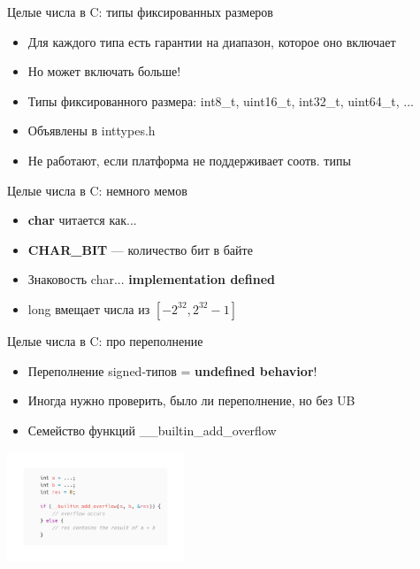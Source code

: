 \documentclass[10pt,pdf,hyperref={unicode}]{beamer}
\begin{document}
\begin{frame}{Целые числа в C: типы фиксированных размеров}
    \begin{itemize}
        \item Для каждого типа есть гарантии на диапазон, которое оно включает
        \item Но может включать больше!
        \item Типы фиксированного размера: int8\_t, uint16\_t, int32\_t, uint64\_t, ...
        \item Объявлены в inttypes.h
        \item Не работают, если платформа не поддерживает соотв. типы
    \end{itemize}
\end{frame}

\begin{frame}{Целые числа в C: немного мемов}
    \begin{itemize}
        \item \textbf{char} читается как... 
        \item \textbf{CHAR\_BIT} — количество бит в байте
        \item Знаковость char... \textbf{implementation defined}
        \item long вмещает числа из $[-2^{32}, 2^{32}-1]$
    \end{itemize}
\end{frame}

\begin{frame}{Целые числа в C: про переполнение}
    \begin{itemize}
        \item Переполнение signed-типов = \textbf{undefined behavior}!
        \item Иногда нужно проверить, было ли переполнение, но без UB
        \item Семейство функций \_\_builtin\_add\_overflow
    \end{itemize}

    \center\includegraphics[width=200px]{bultin_add_overflow.png}
\end{frame}
\end{document}
